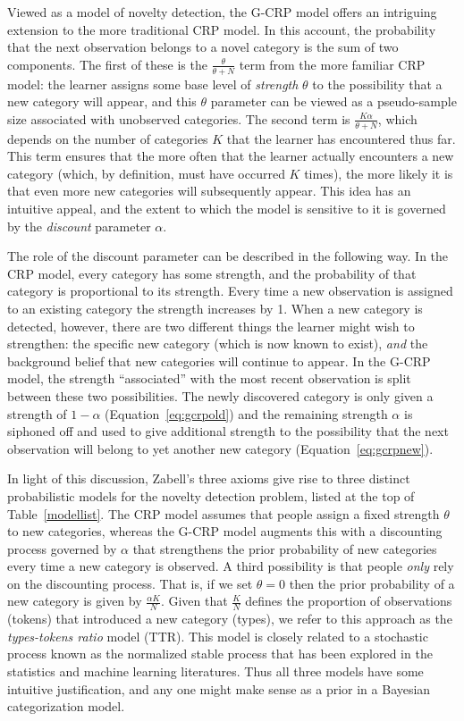 \documentclass[doc]{apa6}
\begin{document}
Viewed as a model of novelty detection, the G-CRP model offers an intriguing extension to the more traditional CRP model. In this account, the probability that the next observation belongs to a novel category is the sum of two components. The first of these is the $\frac{\theta}{\theta+N}$ term from the more familiar CRP model: the learner assigns some base level of {\it strength} $\theta$ to the possibility that a new category will appear, and this $\theta$ parameter can be viewed as a pseudo-sample size associated with unobserved categories. The second term is $\frac{K \alpha}{\theta+N}$, which depends on the number of categories $K$ that the learner has encountered thus far. This term ensures that the more often that the learner actually encounters a new category (which, by definition, must have occurred $K$ times), the more likely it is that even more new categories will subsequently appear. This idea has an intuitive appeal, and the extent to which the model is sensitive to it is governed by the {\it discount} parameter $\alpha$.

The role of the discount parameter can be described in the following way. In the CRP model, every category has some strength, and the probability of that category is proportional to its strength. Every time a new observation is assigned to an existing category the strength increases by 1. When a new category is detected, however, there are two different things the learner might wish to strengthen: the specific new category (which is now known to exist), {\it and} the background belief that new categories will continue to appear. In the G-CRP model, the strength ``associated'' with the most recent observation is split between these two possibilities. The newly discovered category is only given a strength of $1-\alpha$ (Equation~\protect\ref{eq:gcrpold}) and the remaining strength $\alpha$ is siphoned off and used to give additional strength to the possibility that the next observation will belong to yet another new category (Equation~\protect\ref{eq:gcrpnew}).

In light of this discussion, Zabell's three axioms give rise to three distinct probabilistic models for the novelty detection problem, listed at the top of Table~\ref{modellist}. The CRP model assumes that people assign a fixed strength $\theta$ to new categories, whereas the G-CRP model augments this with a discounting process governed by $\alpha$ that strengthens the prior probability of new categories every time a new category is observed. A third possibility is that people {\it only} rely on the discounting process. That is, if we set $\theta = 0$ then the prior probability of a new category is given by $\frac{\alpha K}{N}$. Given that $\frac{K}{N}$ defines the proportion of observations (tokens) that introduced a new category (types), we refer to this approach as the {\it types-tokens ratio} model (TTR).
 This model is closely related to a stochastic process known as the normalized stable process that has been explored in the statistics \cite{kingman_random_1975} and machine learning \cite{wood2009stochastic} literatures. Thus all three models have some intuitive justification, and any one might make sense as a prior in a Bayesian categorization model.
\end{document}
